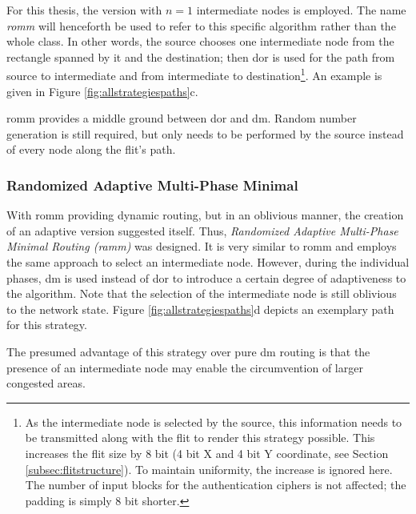 For this thesis, the version with $n = 1$ intermediate nodes is employed. The name \textit{\gls{romm}} will henceforth be used to refer to this
specific algorithm rather than the whole class. In other words, the source chooses one intermediate node from the rectangle spanned by it and
the destination; then \gls{dor} is used for the path from source to intermediate and from intermediate to destination\footnote{As the intermediate
node is selected by the source, this information needs to be transmitted along with the flit to render this strategy possible. This increases the flit
size by 8 bit (4 bit X and 4 bit Y coordinate, see Section \ref{subsec:flitstructure}). To maintain uniformity, the increase is ignored here. The
number of input blocks for the authentication ciphers is not affected; the padding is simply 8 bit shorter.}. An example is given in Figure
\ref{fig:allstrategiespaths}c.

\Gls{romm} provides a middle ground between \gls{dor} and \gls{dm}. Random number generation is still required, but only needs to be performed by the
source instead of every node along the flit's path.

\subsubsection{Randomized Adaptive Multi-Phase Minimal}\label{subsubsec:ramm}
With \gls{romm} providing dynamic routing, but in an oblivious manner, the creation of an adaptive version suggested itself. Thus, \textit{Randomized
Adaptive Multi-Phase Minimal Routing (\gls{ramm})} was designed. It is very similar to \gls{romm} and employs the same approach to select an
intermediate node. However, during the individual phases, \gls{dm} is used instead of \gls{dor} to introduce a certain degree of adaptiveness to the
algorithm. Note that the selection of the intermediate node is still oblivious to the network state. Figure \ref{fig:allstrategiespaths}d depicts an
exemplary path for this strategy.

The presumed advantage of this strategy over pure \gls{dm} routing is that the presence of an intermediate node may enable the circumvention of larger
congested areas.

